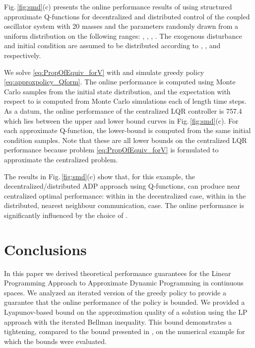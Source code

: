 \documentclass[journal]{IEEEtran}
\newcommand{\textQ}{Q}
\begin{document}
Fig.\,\ref{fig:smd}(c) presents the online performance results of using structured approximate \textQ-functions for decentralized and distributed control of the coupled oscillator system with 20 masses and the parameters randomly drawn from a uniform distribution on the following ranges: , , , .
The exogenous disturbance and initial condition are assumed to be distributed according to , , and  respectively.



We solve \eqref{eq:PropOfEquiv_forV} with  and simulate greedy policy \eqref{eq:approxpolicy_Qform}. The online performance is computed using  Monte Carlo samples from the initial state distribution, and the expectation with respect to  is computed from  Monte Carlo simulations each of length  time steps.
As a datum, the online performance of the centralized LQR controller is 757.4 which lies between the upper and lower bound curves in Fig.\,\ref{fig:smd}(c).
For each approximate \textQ-function, the lower-bound is computed from the same initial condition samples. Note that these are all lower bounds on the centralized LQR performance because problem \eqref{eq:PropOfEquiv_forV} is formulated to approximate the centralized problem.



The results in Fig.\,\ref{fig:smd}(c) show that, for this example, the decentralized/distributed ADP approach using \textQ-functions, can produce near centralized optimal performance: within  in the decentralized case, within  in the distributed, nearest neighbour communication, case. The online performance is significantly influenced by the choice of . 



\section{Conclusions} \label{sec:conclusion}

In this paper we derived theoretical performance guarantees for the Linear Programming Approach to Approximate Dynamic Programming in continuous spaces.
We analyzed an iterated version of the greedy policy to provide a guarantee that the online performance of the policy is bounded.
We provided a Lyapunov-based bound on the approximation quality of a solution using the LP approach with the iterated Bellman inequality. This bound demonstrates a  tightening, compared to the bound presented in \cite{boyd_iteratedBellman}, on the numerical example for which the bounds were evaluated.
\end{document}
